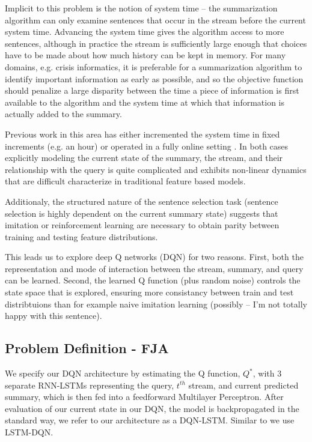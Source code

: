 \documentclass[12pt]{article}
\begin{document}
  Implicit to this problem is the notion of system time -- the 
  summarization algorithm can only examine sentences that occur in the stream
  before the current system time. Advancing the system time gives the algorithm
  access to more sentences, although in practice the stream is sufficiently 
  large enough that choices have to be made about how much history can be 
  kept in memory. For many domains, e.g. crisis informatics, it is preferable
  for a summarization algorithm to identify important information as early as 
  possible, and so the objective function should penalize a large disparity
  between the time a piece of information is first available to the algorithm
  and the system time at which that information is actually added to the 
  summary.

  Previous work in this area has either incremented the system time in fixed
  increments (e.g. an hour) 
  \cite{mccreadie2014incremental,kedzie2015predicting} or operated in
  a fully online setting \cite{guo2013updating,kedzie2016real}. In both cases 
  explicitly 
  modeling the current state of the summary, the stream, and their relationship
  with the query is quite complicated and exhibits non-linear dynamics that 
  are difficult characterize in traditional feature based models.

  Additionaly, the structured nature of the sentence selection task 
  (sentence selection is
  highly dependent on the current summary state) suggests that imitation 
  or reinforcement learning are necessary to obtain parity between training
  and testing feature distributions. 

  This leads us to explore deep Q networks (DQN) for two reasons. 
  First, both the 
  representation and mode of interaction between the stream, summary, and 
  query can be learned. 
  Second, the learned Q function (plus random noise) controls the state 
  space that is explored, ensuring more consistancy between train and test 
  distribtuions than for example naive imitation learning 
  (possibly -- I'm not totally happy with this sentence).

\subsection{Problem Definition - FJA}
We specify our DQN architecture by estimating the Q function, $Q^*$, with 3 separate RNN-LSTMs representing the query, $t^{th}$ stream, and current predicted summary, which is then fed into a feedforward Multilayer Perceptron. After evaluation of our current state in our DQN, the model is backpropagated in the standard way, we refer to our architecture as a DQN-LSTM. Similar to \cite{narasimhan2015language} we use LSTM-DQN.
\end{document}

